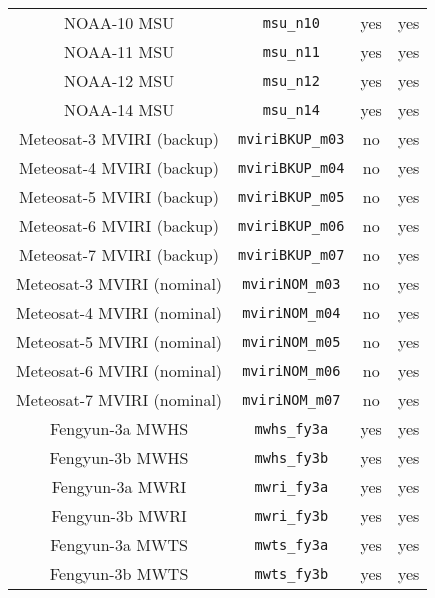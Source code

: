 \begin{center}
\begin{longtable}{c c c c}
  NOAA-10 MSU                        & \texttt{msu\_n10}            &  yes     &  yes       \\
  NOAA-11 MSU                        & \texttt{msu\_n11}            &  yes     &  yes       \\
  NOAA-12 MSU                        & \texttt{msu\_n12}            &  yes     &  yes       \\
  NOAA-14 MSU                        & \texttt{msu\_n14}            &  yes     &  yes       \\
  Meteosat-3 MVIRI (backup)          & \texttt{mviriBKUP\_m03}      &  no      &  yes       \\
  Meteosat-4 MVIRI (backup)          & \texttt{mviriBKUP\_m04}      &  no      &  yes       \\
  Meteosat-5 MVIRI (backup)          & \texttt{mviriBKUP\_m05}      &  no      &  yes       \\
  Meteosat-6 MVIRI (backup)          & \texttt{mviriBKUP\_m06}      &  no      &  yes       \\
  Meteosat-7 MVIRI (backup)          & \texttt{mviriBKUP\_m07}      &  no      &  yes       \\
  Meteosat-3 MVIRI (nominal)         & \texttt{mviriNOM\_m03}       &  no      &  yes       \\
  Meteosat-4 MVIRI (nominal)         & \texttt{mviriNOM\_m04}       &  no      &  yes       \\
  Meteosat-5 MVIRI (nominal)         & \texttt{mviriNOM\_m05}       &  no      &  yes       \\
  Meteosat-6 MVIRI (nominal)         & \texttt{mviriNOM\_m06}       &  no      &  yes       \\
  Meteosat-7 MVIRI (nominal)         & \texttt{mviriNOM\_m07}       &  no      &  yes       \\
  Fengyun-3a MWHS                    & \texttt{mwhs\_fy3a}          &  yes     &  yes       \\
  Fengyun-3b MWHS                    & \texttt{mwhs\_fy3b}          &  yes     &  yes       \\
  Fengyun-3a MWRI                    & \texttt{mwri\_fy3a}          &  yes     &  yes       \\
  Fengyun-3b MWRI                    & \texttt{mwri\_fy3b}          &  yes     &  yes       \\
  Fengyun-3a MWTS                    & \texttt{mwts\_fy3a}          &  yes     &  yes       \\
  Fengyun-3b MWTS                    & \texttt{mwts\_fy3b}          &  yes     &  yes       \\

\end{longtable}
\end{center}
